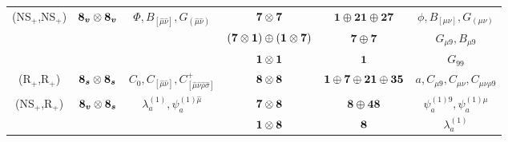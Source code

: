 {\begin{tabular}{|cccccc|}
    \multicolumn{1}{|c|}{\multirow{3}{*}{(NS$_+$,NS$_+$)}} & \multicolumn{1}{c|}{\multirow{3}{*}{$\boldsymbol{8_v} \otimes \boldsymbol{8_v}$}} & \multicolumn{1}{c|}{\multirow{3}{*}{$\Phi, B_{[\hat{\mu}\hat{\nu}]}, G_{(\hat{\mu}\hat{\nu})}$}} & \multicolumn{1}{c|}{$\boldsymbol{7} \otimes \boldsymbol{7}$}                          & \multicolumn{1}{c|}{$\boldsymbol{1} \oplus \boldsymbol{21}\oplus\boldsymbol{27}$}     & $\phi, B_{[\mu\nu]}, G_{(\mu\nu)}$           \\ \cline{4-6} 
    \multicolumn{1}{|c|}{}                                 & \multicolumn{1}{c|}{}                                 & \multicolumn{1}{c|}{}                                                                    & \multicolumn{1}{c|}{$(\boldsymbol{7} \otimes \boldsymbol{1}) \oplus (\boldsymbol{1} \otimes \boldsymbol{7})$} & \multicolumn{1}{c|}{$\boldsymbol{7}\oplus \boldsymbol{7}$}                            & $G_{\mu9}, B_{\mu9}$                     \\ \cline{4-6} 
    \multicolumn{1}{|c|}{}                                 & \multicolumn{1}{c|}{}                                 & \multicolumn{1}{c|}{}                                                                    & \multicolumn{1}{c|}{$\boldsymbol{1} \otimes \boldsymbol{1}$}                                  & \multicolumn{1}{c|}{$\boldsymbol{1}$}                                                 & $G_{99}$                             \\ \hline
    \multicolumn{1}{|c|}{(R$_+$,R$_+$)}                    & \multicolumn{1}{c|}{$\boldsymbol{8_s} \otimes \boldsymbol{8_s}$}                  & \multicolumn{1}{c|}{$C_0, C_{[\hat{\mu}\hat{\nu}]}, C_{[\hat{\mu}\hat{\nu}\hat{\rho}\hat{\sigma}]}^+$}   & \multicolumn{1}{c|}{$\boldsymbol{8} \otimes \boldsymbol{8}$}                          & \multicolumn{1}{c|}{$\boldsymbol{1} \oplus \boldsymbol{7} \oplus \boldsymbol{21} \oplus \boldsymbol{35}$} & $a, C_{\mu9}, C_{\mu\nu}, C_{\mu\nu\rho9}$        \\ \hline
    \multicolumn{1}{|c|}{\multirow{2}{*}{(NS$_+$,R$_+$)}}  & \multicolumn{1}{c|}{\multirow{2}{*}{$\boldsymbol{8_v} \otimes \boldsymbol{8_s}$}} & \multicolumn{1}{c|}{\multirow{2}{*}{${\lambda}_a^{(1)}, {\psi}^{(1)\hat{\mu}}_a$}}         & \multicolumn{1}{c|}{$\boldsymbol{7} \otimes \boldsymbol{8}$}                          & \multicolumn{1}{c|}{$\boldsymbol{8} \oplus\boldsymbol{48}$}                           & $\psi^{(1)9}_a, \psi^{(1)\mu}_a$       \\ \cline{4-6} 
    \multicolumn{1}{|c|}{}                                 & \multicolumn{1}{c|}{}                                 & \multicolumn{1}{c|}{}                                                                    & \multicolumn{1}{c|}{$\boldsymbol{1} \otimes \boldsymbol{8}$}                              & \multicolumn{1}{c|}{$\boldsymbol{8}$}                                                         & $\lambda^{(1)}_a$                    \\ \hline

\end{tabular}}
